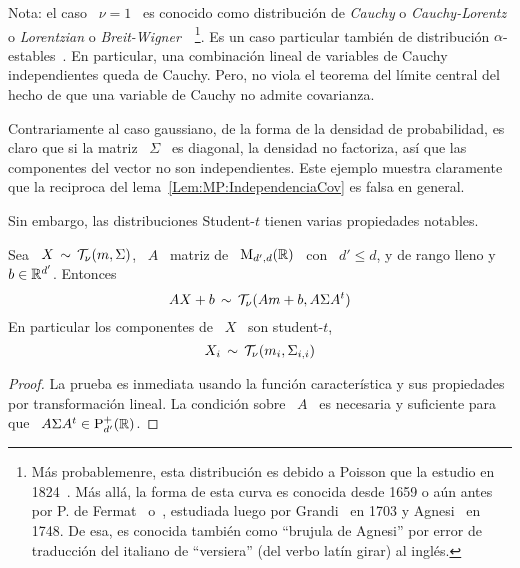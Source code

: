 %
%
%
Nota: el caso  \ $\nu = 1$ \  es conocido como distribuci\'on de  {\em Cauchy} o
{\em  Cauchy-Lorentz} o  {\em Lorentzian}  o  {\em Breit-Wigner}~\cite{Cau53:07,
  Cau53,    Bie53,    Bie53:07,     BreWig36,    Sti74,    SamTaq94,    Lorentz,
  Poi24}~\footnote{M\'as probablemenre, esta  distribuci\'on es debido a Poisson
  que la estudio  en 1824~\cite{Poi24}. M\'as all\'a, la forma  de esta curva es
  conocida desde  1659 o a\'un antes por  P.  de Fermat~\cite[p.~55]{Fer1679:44}
  o~\cite[p.~]{TanHen96:216}, estudiada luego  por Grandi~\cite{Gra1703} en 1703
  y Agnesi~\cite{Agn1748:1:380,Agn1748:2:561} en  1748. De esa, es conocida  tambi\'en como ``brujula de
  Agnesi'' por  error de  traducci\'on del italiano  de ``versiera''  (del verbo
  lat\'in   girar)  al  ingl\'es.}.    Es  un   caso  particular   tambi\'en  de
distribuci\'on    $\alpha$-estables~\cite{SamTaq94}.     En   particular,    una
combinaci\'on   lineal  de   variables   de  Cauchy   independientes  queda   de
Cauchy. Pero,  no viola  el teorema del  l\'imite central  del hecho de  que una
variable de Cauchy no admite covarianza.

Contrariamente al caso gaussiano, de la forma de la densidad de probabilidad, es
claro que si la matriz \ $\Sigma$ \ es diagonal, la densidad no factoriza, as\'i
que  las componentes  del vector  no son  independientes.  Este  ejemplo muestra
claramente que  la reciproca del lema~\ref{Lem:MP:IndependenciaCov}  es falsa en
general.

Sin embargo, las distribuciones Student-$t$ tienen varias propiedades notables.

\begin{lema}
\label{Lem:MP:StabilidadLinealStudentT}
%
  Sea \ $X \, \sim \,  \mathcal{T}_\nu(m,\Sigma)$, \ $A$ \ matriz de \ $\mathrm{M}_{d',d}(\mathbb{R})$
  \ con \ $d' \le d$, y de rango lleno y \ $b \in \mathbb{R}^{d'}$. Entonces
  \[
  A X + b\, \sim \, \mathcal{T}_\nu( A m + b , A \Sigma A^t)
  \]
  En particular los componentes de \ $X$ \ son student-$t$,
  \[
  X_i \, \sim \, \mathcal{T}_\nu(m_i , \Sigma_{i,i} )
  \]
\end{lema}
\begin{proof}
  La prueba es inmediata usando  la funci\'on caracter\'istica y sus propiedades
  por  transformaci\'on lineal.  La condici\'on  sobre \  $A$ \  es  necesaria y
  suficiente para que \ $A \Sigma A^t \in \mathrm{P}_{d'}^+(\mathbb{R})$.
\end{proof}

